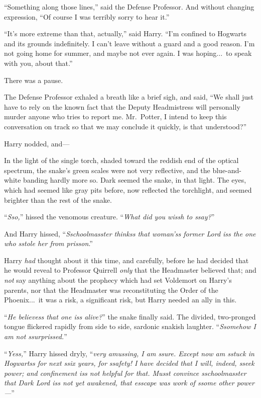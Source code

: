 “Something along those lines,” said the Defense Professor. And without changing expression, “Of course I was terribly sorry to hear it.”

“It’s more extreme than that, actually,” said Harry. “I’m confined to Hogwarts and its grounds indefinitely. I can’t leave without a guard and a good reason. I’m not going home for summer, and maybe not ever again. I was hoping...\ to speak with you, about that.”

There was a pause.

The Defense Professor exhaled a breath like a brief sigh, and said, “We shall just have to rely on the known fact that the Deputy Headmistress will personally murder anyone who tries to report me. Mr.~Potter, I intend to keep this conversation on track so that we may conclude it quickly, is that understood?”

Harry nodded, and—

In the light of the single torch, shaded toward the reddish end of the optical spectrum, the snake’s green scales were not very reflective, and the blue-and-white banding hardly more so. Dark seemed the snake, in that light. The eyes, which had seemed like gray pits before, now reflected the torchlight, and seemed brighter than the rest of the snake.

“\emph{Sso,}” hissed the venomous creature. “\emph{What did you wissh to ssay?}”

And Harry hissed, “\emph{Sschoolmasster thinkss that woman’ss former Lord iss the one who sstole her from prisson}.”

Harry \emph{had} thought about it this time, and carefully, before he had decided that he would reveal to Professor Quirrell \emph{only} that the Headmaster believed that; and \emph{not} say anything about the prophecy which had set Voldemort on Harry’s parents, nor that the Headmaster was reconstituting the Order of the Phoenix...\ it was a risk, a significant risk, but Harry needed an ally in this.

“\emph{He believess that one iss alive?}” the snake finally said. The divided, two-pronged tongue flickered rapidly from side to side, sardonic snakish laughter. “\emph{Ssomehow I am not ssurprissed.}”

“\emph{Yess,}” Harry hissed dryly, “\emph{very amussing, I am ssure. Except now am sstuck in Hogwartss for next ssix years, for ssafety! I have decided that I will, indeed, sseek power; and confinement iss not helpful for that. Musst convince sschoolmasster that Dark Lord iss not yet awakened, that esscape was work of ssome other power—}”

